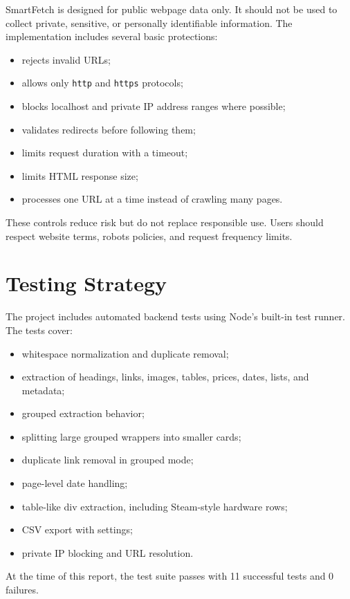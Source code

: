 \documentclass[11pt,a4paper]{article}
\newcommand{\tech}[1]{\texttt{#1}}
\begin{document}
SmartFetch is designed for public webpage data only. It should not be used to collect private, sensitive, or personally identifiable information. The implementation includes several basic protections:

\begin{itemize}
  \item rejects invalid URLs;
  \item allows only \tech{http} and \tech{https} protocols;
  \item blocks localhost and private IP address ranges where possible;
  \item validates redirects before following them;
  \item limits request duration with a timeout;
  \item limits HTML response size;
  \item processes one URL at a time instead of crawling many pages.
\end{itemize}

These controls reduce risk but do not replace responsible use. Users should respect website terms, robots policies, and request frequency limits.

\section{Testing Strategy}

The project includes automated backend tests using Node's built-in test runner. The tests cover:

\begin{itemize}
  \item whitespace normalization and duplicate removal;
  \item extraction of headings, links, images, tables, prices, dates, lists, and metadata;
  \item grouped extraction behavior;
  \item splitting large grouped wrappers into smaller cards;
  \item duplicate link removal in grouped mode;
  \item page-level date handling;
  \item table-like div extraction, including Steam-style hardware rows;
  \item CSV export with settings;
  \item private IP blocking and URL resolution.
\end{itemize}

At the time of this report, the test suite passes with 11 successful tests and 0 failures.
\end{document}
